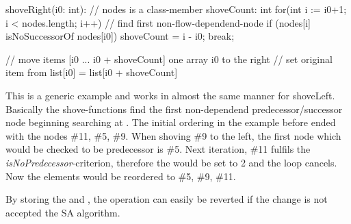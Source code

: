 %
%
shoveRight(i0: int):
	// nodes is a class-member
	shoveCount: int
	for(int i := i0+1; i < nodes.length; i++)
		// find first non-flow-dependend-node
		if (nodes[i] isNoSuccessorOf nodes[i0])
			shoveCount = i - i0;
			break;

	// move items  [i0 ... i0 + shoveCount] one array i0 to the right
	// set original item from list[i0] = list[i0 + shoveCount]

This is a generic example and works in almost the same manner for shoveLeft. Basically the shove-functions find the first non-dependend predecessor/successor node beginning searching at . The initial ordering in the example before ended with the nodes \#11, \#5, \#9. When shoving \#9 to the left, the first node which would be checked to be predecessor is \#5. Next iteration, \#11 fulfils the \textit{isNoPredecessor}-criterion, therefore the  would be set to 2 and the loop cancels. Now the elements would be reordered to \#5, \#9, \#11.\par
By storing the  and , the operation can easily be reverted if the change is not accepted the SA algorithm.
	
